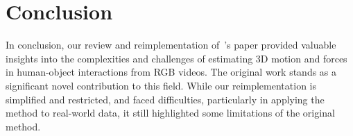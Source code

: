 \section{Conclusion}
\label{sec:conclusion}

In conclusion, our review and reimplementation of~\citet{li2019estimating}'s paper provided valuable insights into the complexities 
and challenges of estimating 3D motion and forces in human-object interactions from RGB videos. 
The original work stands as a significant novel contribution to this field. While our reimplementation is simplified and restricted, 
and faced difficulties, particularly in applying the method to real-world data, it still highlighted some limitations of the original method.


